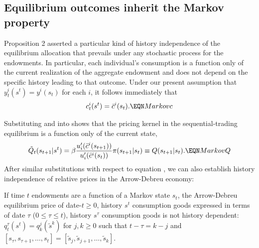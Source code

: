 \subsection{Equilibrium outcomes inherit the Markov property}
Proposition 2  asserted a particular kind of history independence
of the equilibrium allocation that prevails under any
stochastic process for the endowments. In particular, each
individual's consumption is  a function only of the current
realization of the aggregate endowment and does not depend on the
specific history leading to that outcome. Under %
our present assumption that $y_t^i(s^t)= y^i(s_t)$ for each $i$, it follows immediately that
$$
c^i_t(s^t) = \bar c^i(s_t).     \EQN Markovc
$$

Substituting  and  into
 shows that the pricing kernel in the sequential-trading
equilibrium is   a function only of the current state,
$$
\tilde Q_t(s_{t+1} | s^t) = \beta
{ u'_i(\bar c^i(s_{t+1})) \over u'_i(\bar c^i(s_t)) }
\pi(s_{t+1} | s_t) \equiv Q(s_{t+1} | s_t).   \EQN MarkovQ
$$
After similar substitutions with respect to equation ,
we can also
establish history independence of  relative prices in the
Arrow-Debreu economy:




\medskip
{}  If time $t$  endowments are a function of a Markov
state $s_t$, the Arrow-Debreu equilibrium price of date-$t\geq 0$,
history $s^t$
consumption goods expressed in terms of date $\tau$ ($0\leq \tau \leq t$),
history $s^\tau$
consumption goods is not history dependent:
$q^\tau_t(s^t) = q^{j}_{k}(\tilde s^{k})$ for $j, k \geq 0$
such that $t-\tau=k-j$ and
$[s_\tau, s_{\tau+1}, \ldots , s_t] =
 [\tilde s_{j}, \tilde s_{j+1}, \ldots , \tilde s_{k}]$.
\medskip


